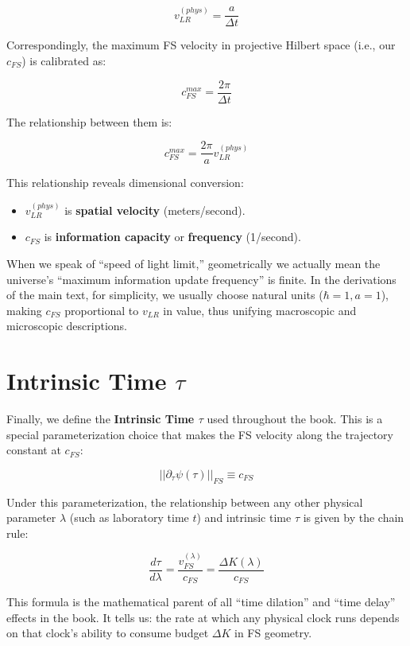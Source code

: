\[v_{LR}^{(phys)} = \frac{a}{\Delta t}\]

Correspondingly, the maximum FS velocity in projective Hilbert space (i.e., our $c_{FS}$) is calibrated as:

\[c_{FS}^{max} = \frac{2\pi}{\Delta t}\]

The relationship between them is:

\[c_{FS}^{max} = \frac{2\pi}{a} v_{LR}^{(phys)}\]

This relationship reveals dimensional conversion:

\begin{itemize}
\item $v_{LR}^{(phys)}$ is \textbf{spatial velocity} (meters/second).

\item $c_{FS}$ is \textbf{information capacity} or \textbf{frequency} (1/second).
\end{itemize}

When we speak of ``speed of light limit,'' geometrically we actually mean the universe's ``maximum information update frequency'' is finite. In the derivations of the main text, for simplicity, we usually choose natural units ($\hbar=1, a=1$), making $c_{FS}$ proportional to $v_{LR}$ in value, thus unifying macroscopic and microscopic descriptions.

\section{Intrinsic Time $\tau$}

Finally, we define the \textbf{Intrinsic Time $\tau$} used throughout the book. This is a special parameterization choice that makes the FS velocity along the trajectory constant at $c_{FS}$:

\[||\partial_{\tau}\psi(\tau)||_{FS} \equiv c_{FS}\]

Under this parameterization, the relationship between any other physical parameter $\lambda$ (such as laboratory time $t$) and intrinsic time $\tau$ is given by the chain rule:

\[\frac{d\tau}{d\lambda} = \frac{v_{FS}^{(\lambda)}}{c_{FS}} = \frac{\Delta K(\lambda)}{c_{FS}}\]

This formula is the mathematical parent of all ``time dilation'' and ``time delay'' effects in the book. It tells us: the rate at which any physical clock runs depends on that clock's ability to consume budget $\Delta K$ in FS geometry.

